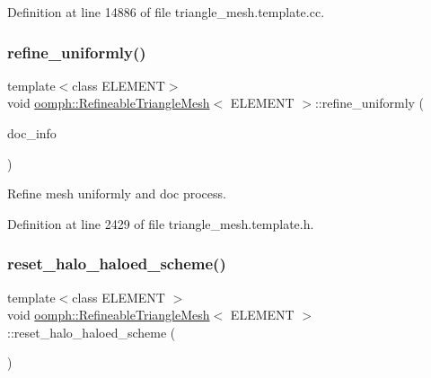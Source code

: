 Definition at line 14886 of file triangle\+\_\+mesh.\+template.\+cc.

\mbox{\label{classoomph_1_1RefineableTriangleMesh_a4820744f95d69328dfa4185fff21dd7b}} 
\subsubsection{\texorpdfstring{refine\+\_\+uniformly()}{refine\_uniformly()}}
{\footnotesize\ttfamily template$<$class E\+L\+E\+M\+E\+NT$>$ \\
void \hyperlink{classoomph_1_1RefineableTriangleMesh}{oomph\+::\+Refineable\+Triangle\+Mesh}$<$ E\+L\+E\+M\+E\+NT $>$\+::refine\+\_\+uniformly (\begin{DoxyParamCaption}\item[{Doc\+Info \&}]{doc\+\_\+info }\end{DoxyParamCaption})\hspace{0.3cm}{\ttfamily [inline]}}



Refine mesh uniformly and doc process. 



Definition at line 2429 of file triangle\+\_\+mesh.\+template.\+h.

\mbox{\label{classoomph_1_1RefineableTriangleMesh_a9ba5601a6630b8c2c2ee75fe11d2c6be}} 
\subsubsection{\texorpdfstring{reset\+\_\+halo\+\_\+haloed\+\_\+scheme()}{reset\_halo\_haloed\_scheme()}}
{\footnotesize\ttfamily template$<$class E\+L\+E\+M\+E\+NT $>$ \\
void \hyperlink{classoomph_1_1RefineableTriangleMesh}{oomph\+::\+Refineable\+Triangle\+Mesh}$<$ E\+L\+E\+M\+E\+NT $>$\+::reset\+\_\+halo\+\_\+haloed\+\_\+scheme (\begin{DoxyParamCaption}{ }\end{DoxyParamCaption})\hspace{0.3cm}{\ttfamily [protected]}}



